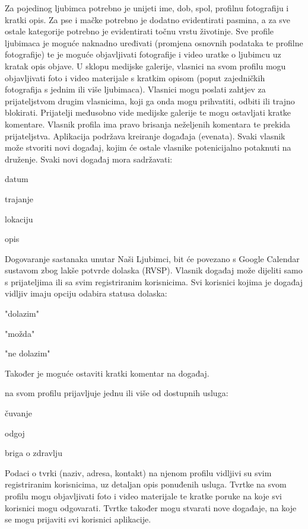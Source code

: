 		\par Za pojedinog ljubimca potrebno je unijeti ime, dob, spol, profilnu fotografiju i kratki opis. Za pse i mačke potrebno je dodatno evidentirati pasmina, a za sve ostale kategorije potrebno je evidentirati točnu vrstu životinje. Sve profile ljubimaca je moguće naknadno uređivati (promjena osnovnih podataka te profilne fotografije) te je moguće objavljivati fotografije i video uratke o ljubimcu uz kratak opis objave. U sklopu medijske galerije, vlasnici na svom profilu mogu objavljivati foto i video materijale s kratkim opisom (poput zajedničkih fotografija s jednim ili više ljubimaca). Vlasnici mogu poslati zahtjev za prijateljstvom drugim vlasnicima, koji ga onda mogu prihvatiti, odbiti ili trajno blokirati. Prijatelji međusobno vide medijske galerije te mogu ostavljati kratke komentare. Vlasnik profila ima pravo brisanja neželjenih komentara te prekida prijateljstva. Aplikacija podržava kreiranje događaja (evenata). Svaki vlasnik može stvoriti novi događaj, kojim će ostale vlasnike potenicijalno potaknuti na druženje. Svaki novi događaj mora sadržavati:
		
		\begin{packed_item}
			\item datum
			\item trajanje
			\item lokaciju 
			\item opis
		\end{packed_item}
		Dogovaranje sastanaka unutar Naši Ljubimci, bit će povezano s Google Calendar sustavom zbog lakše potvrde dolaska (RVSP). Vlasnik događaj može dijeliti samo s prijateljima ili sa svim registriranim korisnicima. Svi korisnici kojima je događaj vidljiv imaju opciju odabira statusa dolaska: 
		\begin{packed_item}
			\item "dolazim"
			\item "možda"
			\item "ne dolazim" 
		\end{packed_item}
		Također je moguće ostaviti kratki komentar na događaj.
		
		\par {} na svom profilu prijavljuje jednu ili više od dostupnih usluga:
		\begin{packed_item}
			\item čuvanje
			\item odgoj
			\item briga o zdravlju 
		\end{packed_item}
		Podaci o tvrki (naziv, adresa, kontakt) na njenom profilu vidljivi su svim registriranim korisnicima, uz detaljan opis ponuđenih usluga. Tvrtke na svom profilu mogu objavljivati foto i video materijale te kratke poruke na koje svi korisnici mogu odgovarati. Tvrtke također mogu stvarati nove događaje, na koje se mogu prijaviti svi korisnici aplikacije.
		
